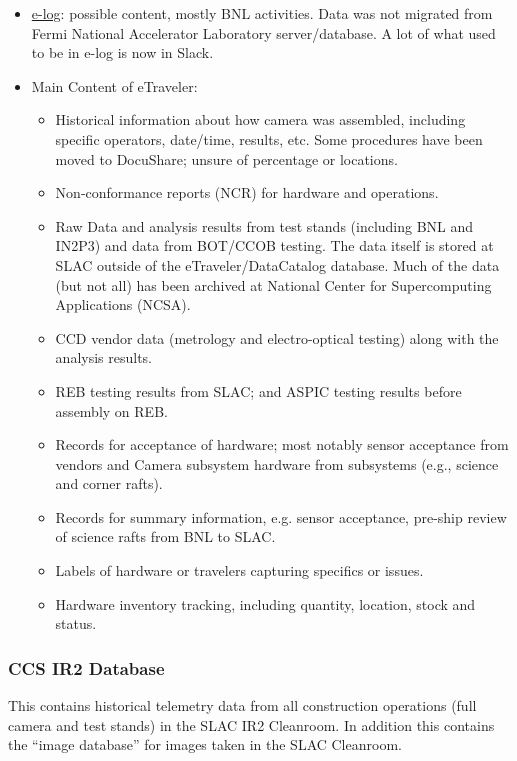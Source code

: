 \begin{itemize}
	\item \href{http://dbweb0.fnal.gov/ECL/lsst_camera}{e-log}: possible content, mostly BNL activities. Data was not migrated from Fermi National Accelerator Laboratory server/database. A lot of what used to be in e-log is now in Slack.
	\item Main Content of eTraveler:
	\begin{itemize}
		\item Historical information about how camera was assembled, including specific operators, date/time, results, etc. Some procedures have been moved to DocuShare; unsure of percentage or locations.
		\item Non-conformance reports (NCR) for hardware and operations.
		\item Raw Data and analysis results from test stands (including BNL and IN2P3) and data from BOT/CCOB testing. The data itself is stored at SLAC outside of the eTraveler/DataCatalog database. Much of the data (but not all) has been archived at National Center for Supercomputing Applications (NCSA).
		\item CCD vendor data (metrology and electro-optical testing) along with the analysis results.
		\item REB testing results from SLAC; and ASPIC testing results before assembly on REB.
		\item Records for acceptance of hardware; most notably sensor acceptance from vendors and Camera subsystem hardware from subsystems (e.g., science and corner rafts).
		\item Records for summary information, e.g. sensor acceptance, pre-ship review of science rafts from BNL to SLAC.
		\item Labels of hardware or travelers capturing specifics or issues.
		\item Hardware inventory tracking, including quantity, location, stock and status.
	\end{itemize}
\end{itemize}

\subsubsection{CCS IR2 Database}

This contains historical telemetry data from all construction operations (full camera and test stands) in the SLAC IR2 Cleanroom.
In addition this contains the ``image database'' for images taken in the SLAC Cleanroom.

